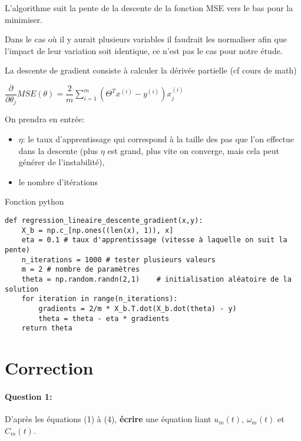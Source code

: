 L'algorithme suit la pente de la descente de la fonction MSE vers le bas pour la minimiser.

Dans le cas où il y aurait plusieurs variables il faudrait les normaliser afin que l'impact de leur variation soit identique, ce n'est pas le cas pour notre étude.

La descente de gradient consiste à calculer la dérivée partielle (cf cours de math)
\begin{center}
$\dfrac{\partial}{\partial \theta_j}MSE(\theta)=\dfrac{2}{m}\sum\limits_{i=1}^m (\Theta^T x^{(i)}-y^{(i)})x_j^{(i)}$
\end{center}

On prendra en entrée:
\begin{itemize}
 \item $\eta$: le taux d'apprentissage qui correspond à la taille des pas que l'on effectue dans la descente (plus $\eta$ est grand, plus vite on converge, mais cela peut générer de l'instabilité),
 \item le nombre d'itérations
\end{itemize}

Fonction python
\begin{lstlisting}
def regression_lineaire_descente_gradient(x,y):
    X_b = np.c_[np.ones((len(x), 1)), x]
    eta = 0.1 # taux d'apprentissage (vitesse à laquelle on suit la pente)
    n_iterations = 1000 # tester plusieurs valeurs
    m = 2 # nombre de paramètres
    theta = np.random.randn(2,1)    # initialisation aléatoire de la solution
    for iteration in range(n_iterations):
        gradients = 2/m * X_b.T.dot(X_b.dot(theta) - y)
        theta = theta - eta * gradients
    return theta
\end{lstlisting}

\ifdef{\public}{}{}

\clearpage

\newpage

\pagestyle{correction}

\section{Correction}

\paragraph{Question 1:} D'après les équations (1) à (4), \textbf{écrire} une équation liant $u_m(t)$, $\omega_m(t)$ et $C_m(t)$.

